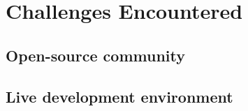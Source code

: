 \chapter{Challenges Encountered}

\section{Open-source community}

\section{Live development environment}